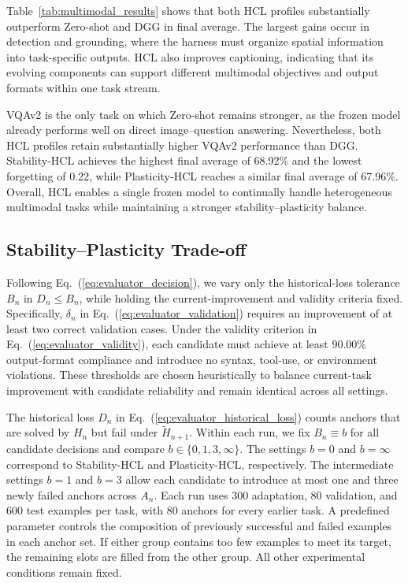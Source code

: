 \documentclass{article}
\begin{document}
Table~\ref{tab:multimodal_results} shows that both HCL profiles substantially
outperform Zero-shot and DGG in final average. The largest gains occur in
detection and grounding, where the harness must organize spatial information
into task-specific outputs. HCL also improves captioning, indicating that its
evolving components can support different multimodal objectives and output
formats within one task stream.

VQAv2 is the only task on which Zero-shot remains stronger, as the frozen model
already performs well on direct image--question answering. Nevertheless, both
HCL profiles retain substantially higher VQAv2 performance than DGG.
Stability-HCL achieves the highest final average of 68.92\% and the lowest
forgetting of 0.22, while Plasticity-HCL reaches a similar final average of
67.96\%. Overall, HCL enables a single frozen model to continually handle
heterogeneous multimodal tasks while maintaining a stronger
stability--plasticity balance.
\subsection{Stability--Plasticity Trade-off}
\label{sec:stability_plasticity}

Following Eq.~(\ref{eq:evaluator_decision}), we vary only the historical-loss tolerance $B_n$ in $D_n \leq B_n$, while holding the current-improvement and validity criteria fixed. Specifically, $\delta_n$ in Eq.~(\ref{eq:evaluator_validation}) requires an improvement of at least two correct validation cases. Under the validity criterion in Eq.~(\ref{eq:evaluator_validity}), each candidate must achieve at least 90.00\% output-format compliance and introduce no syntax, tool-use, or environment violations. These thresholds are chosen heuristically to balance current-task improvement with candidate reliability and remain identical across all settings.

The historical loss $D_n$ in
Eq.~(\ref{eq:evaluator_historical_loss}) counts anchors that are solved by
$H_n$ but fail under $\widetilde{H}_{n+1}$. Within each run, we fix
$B_n \equiv b$ for all candidate decisions and compare
$b \in \{0,1,3,\infty\}$. The settings $b=0$ and $b=\infty$ correspond to
Stability-HCL and Plasticity-HCL, respectively. The intermediate settings
$b=1$ and $b=3$ allow each candidate to introduce at most one and three newly
failed anchors across $A_n$. Each run uses 300 adaptation, 80 validation, and 600 test examples per task, with 80 anchors for every earlier task. A predefined parameter controls the composition of previously successful and failed examples in each anchor set. If either group contains too few examples to meet its target, the remaining slots are filled from the other group. All other experimental conditions remain fixed.
\end{document}
